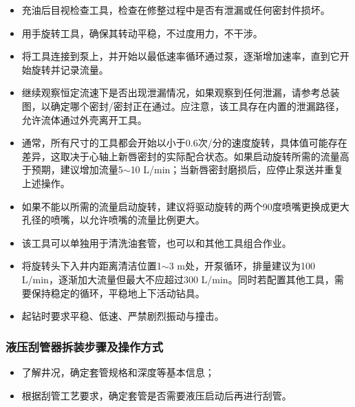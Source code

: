 \begin{itemize}
	
	\item 充油后目视检查工具，检查在修整过程中是否有泄漏或任何密封件损坏。
	
	\item 用手旋转工具，确保其转动平稳，不过度用力，不干涉。
	
	\item 将工具连接到泵上，并开始以最低速率循环通过泵，逐渐增加速率，直到它开始旋转并记录流量。
	
	\item 继续观察恒定流速下是否出现泄漏情况，如果观察到任何泄漏，请参考总装图，以确定哪个密封/密封正在通过。应注意，该工具存在内置的泄漏路径，允许流体通过外壳离开工具。
	
	\item 通常，所有尺寸的工具都会开始以小于0.6次/分的速度旋转，具体值可能存在差异，这取决于心轴上新唇密封的实际配合状态。如果启动旋转所需的流量高于预期，建议增加流量5$\sim$10 L/min；当新唇密封磨损后，应停止泵送并重复上述操作。
	
	\item 如果不能以所需的流量启动旋转，建议将驱动旋转的两个90度喷嘴更换成更大孔径的喷嘴，以允许喷嘴的流量比例更大。
	\end{itemize}
	
	\begin{itemize}
		
	\item 该工具可以单独用于清洗油套管，也可以和其他工具组合作业。
	
	\item 将旋转头下入井内距离清洁位置1$\sim$3 m处，开泵循环，排量建议为100 L/min，逐渐加大流量但最大不应超过300 L/min。同时若配置其他工具，需要保持稳定的循环，平稳地上下活动钻具。
	
	\item 起钻时要求平稳、低速、严禁剧烈振动与撞击。
	\end{itemize}

\subsubsection{液压刮管器拆装步骤及操作方式}

		\begin{itemize}
		\item 了解井况，确定套管规格和深度等基本信息；
		\item 根据刮管工艺要求，确定套管是否需要液压启动后再进行刮管。
		\end{itemize}
	
